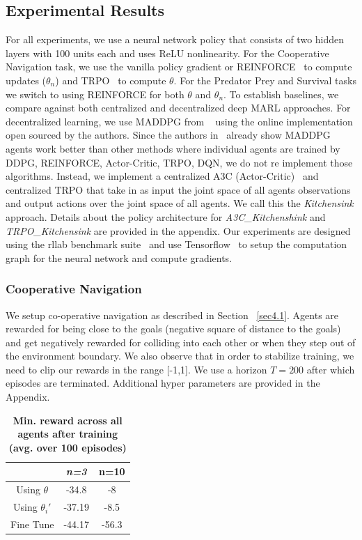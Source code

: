 \documentclass{article}
\begin{document}
\subsection{Experimental Results}
For all experiments, we use a neural network policy that consists of two hidden layers with 100 units each and uses ReLU nonlinearity. For the Cooperative Navigation task, we use the vanilla policy gradient or REINFORCE~\cite{reinforce} to compute updates ($\theta_n$) and TRPO~\cite{schulman2015trust} to compute $\theta$. For the Predator Prey and Survival tasks we switch to using REINFORCE for both $\theta$ and $\theta_n$. To establish baselines, we compare against both centralized and decentralized deep MARL approaches. For decentralized learning, we use MADDPG from ~\cite{lowe2017multi} using the online implementation open sourced by the authors. Since the authors in~\cite{lowe2017multi} already show MADDPG agents work better than other methods where individual agents are trained by DDPG, REINFORCE, Actor-Critic, TRPO, DQN, we do not re implement those algorithms. Instead, we implement a centralized A3C (Actor-Critic)~\cite{mnih2016asynchronous} and centralized TRPO that take in as input the joint space of all agents observations and output actions over the joint space of all agents. We call this the \textit{Kitchensink} approach. Details about the policy architecture for \textit{A3C\_Kitchenshink} and \textit{TRPO\_Kitchensink} are provided in the appendix. Our experiments are designed using the rllab benchmark suite~\cite{duan2016benchmarking} and use Tensorflow~\cite{tensorflow2015-whitepaper} to setup the computation graph for the neural network and compute gradients. 
\subsubsection{Cooperative Navigation}
We setup co-operative navigation as described in Section ~\ref{sec4.1}. Agents are rewarded for being close to the goals (negative square of distance to the goals) and get negatively rewarded for colliding into each other or when they step out of the environment boundary. We also observe that in order to stabilize training, we need to clip our rewards in the range [-1,1]. We use a horizon $T=200$ after which episodes are terminated. Additional hyper parameters are provided in the Appendix. 

\begin{table}
	{\begin{tabular}{|c|c|c|}
	\hline
	\textbf{} & \textbf{\textit{n=3}} &\textbf{n=10}  \\  \hline
	{Using $\theta$}  & -34.8  & -8 \\ \hline
	{Using $\theta_i'$}  & -37.19 & -8.5 \\ \hline
	{Fine Tune} & -44.17 & -56.3 \\ \hline
    \end{tabular}}
\caption{\textbf {Min. reward across all agents after training (avg. over 100 episodes)}} 
\label{table:Results1}
\end{table}
\end{document}
